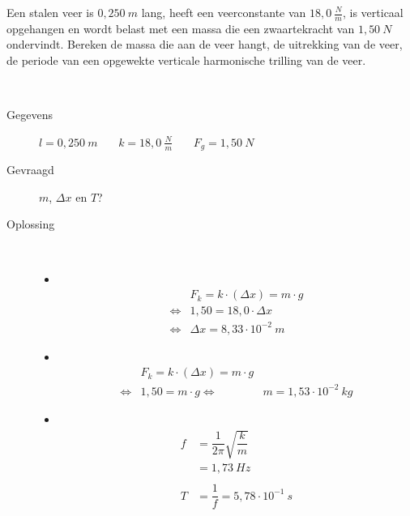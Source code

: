 \documentclass{ximera}
\begin{document}
    \begin{exercise} 
        Een stalen veer is $0,250 \ m$ lang, heeft een veerconstante van $18,0  \ \frac{N}{m}$, is verticaal opgehangen en wordt belast met een massa die een zwaartekracht van $1,50 \ N$ ondervindt. Bereken de massa die aan de veer hangt, de uitrekking van de veer, de periode van een opgewekte verticale harmonische trilling van de veer.
         \begin{oplossing} \ \\
            \begin{description}
                \item [Gegevens] $l=0,250 \ m$ \ \ \ $k=18,0 \ \frac{N}{m}$ \ \ \ $F_g=1,50 \ N$
                \item [Gevraagd] $m$, $\Delta x$ en $T$?
                \item [Oplossing] \ 
                    \begin{itemize}
                        \item \
                        \begin{align*}
                            &F_k=k\cdot (\Delta x)= m\cdot g \\
                            \Leftrightarrow & 1,50 = 18,0 \cdot \Delta x \\
                            \Leftrightarrow & \Delta x = 8,33 \cdot 10^{-2} \ m
                        \end{align*}
                        \item \
                        \begin{align*}
                            &F_k=k\cdot (\Delta x)= m\cdot g \\
                            \Leftrightarrow & 1,50 = m\cdot g
                            \Leftrightarrow & m= 1,53\cdot 10^{-2} \ kg
                        \end{align*}
                        \item \
                        \begin{align*}
                    f&=\dfrac{1}{2\pi}\sqrt{\dfrac{k}{m}}\\
                    &=1,73 \ Hz \\ \\
                    T&=\dfrac{1}{f}=5,78\cdot 10^{-1} \ s
                \end{align*}
                    \end{itemize}
           \end{description}
        \end{oplossing}
    \end{exercise}
    
\end{document}
